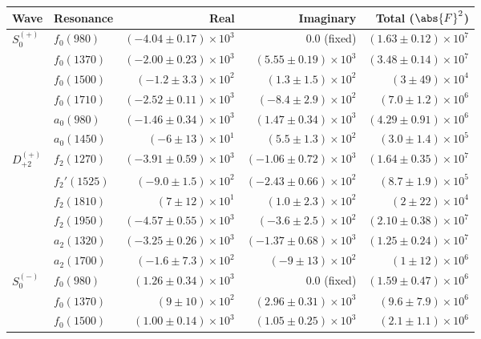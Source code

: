 \begin{table}[ht]
    \begin{center}
        \begin{tabular}{llrrr}\toprule
        Wave & Resonance & Real & Imaginary & Total ($\abs{F}^2$) \\\midrule
$S_{0}^{(+)}$ & $f_{0}(980)$ & $(-4.04 \pm 0.17) \times 10^{3}$ & $0.0$ (fixed) & $(1.63 \pm 0.12) \times 10^{7}$ \\
 & $f_{0}(1370)$ & $(-2.00 \pm 0.23) \times 10^{3}$ & $(5.55 \pm 0.19) \times 10^{3}$ & $(3.48 \pm 0.14) \times 10^{7}$ \\
 & $f_{0}(1500)$ & $(-1.2 \pm 3.3) \times 10^{2}$ & $(1.3 \pm 1.5) \times 10^{2}$ & $(3 \pm 49) \times 10^{4}$ \\
 & $f_{0}(1710)$ & $(-2.52 \pm 0.11) \times 10^{3}$ & $(-8.4 \pm 2.9) \times 10^{2}$ & $(7.0 \pm 1.2) \times 10^{6}$ \\
 & $a_{0}(980)$ & $(-1.46 \pm 0.34) \times 10^{3}$ & $(1.47 \pm 0.34) \times 10^{3}$ & $(4.29 \pm 0.91) \times 10^{6}$ \\
 & $a_{0}(1450)$ & $(-6 \pm 13) \times 10^{1}$ & $(5.5 \pm 1.3) \times 10^{2}$ & $(3.0 \pm 1.4) \times 10^{5}$ \\
$D_{+2}^{(+)}$ & $f_{2}(1270)$ & $(-3.91 \pm 0.59) \times 10^{3}$ & $(-1.06 \pm 0.72) \times 10^{3}$ & $(1.64 \pm 0.35) \times 10^{7}$ \\
 & $f_{2}'(1525)$ & $(-9.0 \pm 1.5) \times 10^{2}$ & $(-2.43 \pm 0.66) \times 10^{2}$ & $(8.7 \pm 1.9) \times 10^{5}$ \\
 & $f_{2}(1810)$ & $(7 \pm 12) \times 10^{1}$ & $(1.0 \pm 2.3) \times 10^{2}$ & $(2 \pm 22) \times 10^{4}$ \\
 & $f_{2}(1950)$ & $(-4.57 \pm 0.55) \times 10^{3}$ & $(-3.6 \pm 2.5) \times 10^{2}$ & $(2.10 \pm 0.38) \times 10^{7}$ \\
 & $a_{2}(1320)$ & $(-3.25 \pm 0.26) \times 10^{3}$ & $(-1.37 \pm 0.68) \times 10^{3}$ & $(1.25 \pm 0.24) \times 10^{7}$ \\
 & $a_{2}(1700)$ & $(-1.6 \pm 7.3) \times 10^{2}$ & $(-9 \pm 13) \times 10^{2}$ & $(1 \pm 12) \times 10^{6}$ \\
$S_{0}^{(-)}$ & $f_{0}(980)$ & $(1.26 \pm 0.34) \times 10^{3}$ & $0.0$ (fixed) & $(1.59 \pm 0.47) \times 10^{6}$ \\
 & $f_{0}(1370)$ & $(9 \pm 10) \times 10^{2}$ & $(2.96 \pm 0.31) \times 10^{3}$ & $(9.6 \pm 7.9) \times 10^{6}$ \\
 & $f_{0}(1500)$ & $(1.00 \pm 0.14) \times 10^{3}$ & $(1.05 \pm 0.25) \times 10^{3}$ & $(2.1 \pm 1.1) \times 10^{6}$ \\

\end{tabular}
\end{center}
\end{table}
